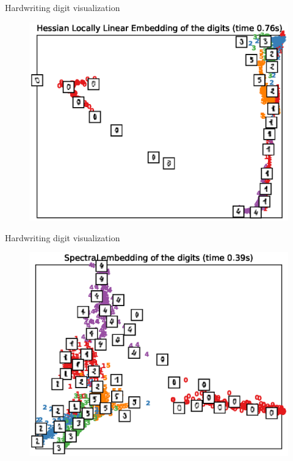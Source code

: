 \documentclass[10pt]{beamer}
\begin{document}
\begin{frame}{Hardwriting digit visualization}
\begin{figure}
\centering
\includegraphics[scale=0.65]{./image/experiment/hlle.eps}
\end{figure}
\end{frame}

\begin{frame}{Hardwriting digit visualization}
\begin{figure}
\centering
\includegraphics[scale=0.65]{./image/experiment/le.eps}
\end{figure}
\end{frame}
\end{document}
